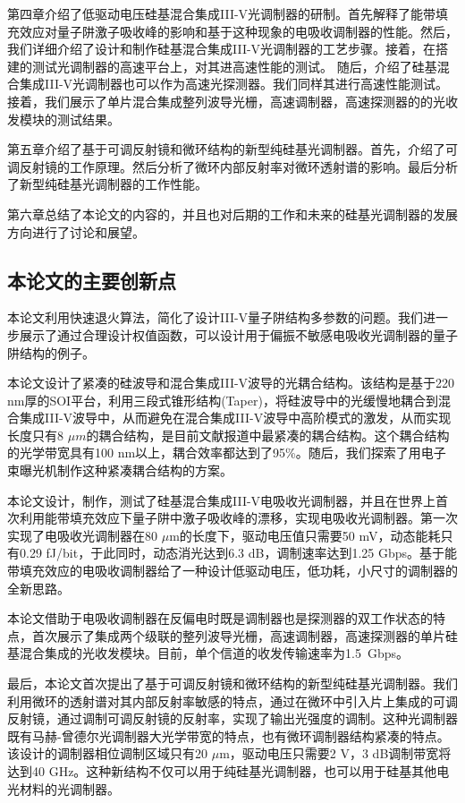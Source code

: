 第四章介绍了低驱动电压硅基混合集成III-V光调制器的研制。首先解释了能带填充效应对量子阱激子吸收峰的影响和基于这种现象的电吸收调制器的性能。然后，我们详细介绍了设计和制作硅基混合集成III-V光调制器的工艺步骤。接着，在搭建的测试光调制器的高速平台上，对其进高速性能的测试。 随后，介绍了硅基混合集成III-V光调制器也可以作为高速光探测器。我们同样其进行高速性能测试。接着，我们展示了单片混合集成整列波导光栅，高速调制器，高速探测器的的光收发模块的测试结果。

第五章介绍了基于可调反射镜和微环结构的新型纯硅基光调制器。首先，介绍了可调反射镜的工作原理。然后分析了微环内部反射率对微环透射谱的影响。最后分析了新型纯硅基光调制器的工作性能。

第六章总结了本论文的内容的，并且也对后期的工作和未来的硅基光调制器的发展方向进行了讨论和展望。

\subsection{本论文的主要创新点}
本论文利用快速退火算法，简化了设计III-V量子阱结构多参数的问题。我们进一步展示了通过合理设计权值函数，可以设计用于偏振不敏感电吸收光调制器的量子阱结构的例子。

本论文设计了紧凑的硅波导和混合集成III-V波导的光耦合结构。该结构是基于220 nm厚的SOI平台，利用三段式锥形结构(Taper)，将硅波导中的光缓慢地耦合到混合集成III-V波导中，从而避免在混合集成III-V波导中高阶模式的激发，从而实现长度只有8 $\mu m$的耦合结构，是目前文献报道中最紧凑的耦合结构。这个耦合结构的光学带宽具有100 nm以上，耦合效率都达到了95\%。随后，我们探索了用电子束曝光机制作这种紧凑耦合结构的方案。

本论文设计，制作，测试了硅基混合集成III-V电吸收光调制器，并且在世界上首次利用能带填充效应下量子阱中激子吸收峰的漂移，实现电吸收光调制器。第一次实现了电吸收光调制器在80  $\mu$m的长度下，驱动电压值只需要50 mV，动态能耗只有0.29 fJ/bit，于此同时，动态消光达到6.3 dB，调制速率达到1.25 Gbps。基于能带填充效应的电吸收调制器给了一种设计低驱动电压，低功耗，小尺寸的调制器的全新思路。

本论文借助于电吸收调制器在反偏电时既是调制器也是探测器的双工作状态的特点，首次展示了集成两个级联的整列波导光栅，高速调制器，高速探测器的单片硅基混合集成的光收发模块。目前，单个信道的收发传输速率为1.5~Gbps。 

最后，本论文首次提出了基于可调反射镜和微环结构的新型纯硅基光调制器。我们利用微环的透射谱对其内部反射率敏感的特点，通过在微环中引入片上集成的可调反射镜，通过调制可调反射镜的反射率，实现了输出光强度的调制。这种光调制器既有马赫-曾德尔光调制器大光学带宽的特点，也有微环调制器结构紧凑的特点。该设计的调制器相位调制区域只有20 $\mu$m，驱动电压只需要2 V，3 dB调制带宽将达到40 GHz。这种新结构不仅可以用于纯硅基光调制器，也可以用于硅基其他电光材料的光调制器。




